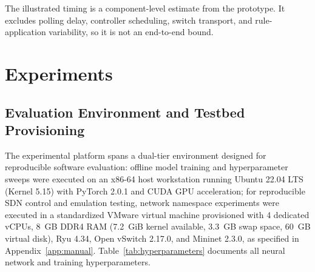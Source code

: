 \documentclass[12pt,a4paper,oneside]{report}
\begin{document}
The illustrated timing is a component-level estimate from the prototype. It excludes polling delay, controller scheduling, switch transport, and rule-application variability, so it is not an end-to-end bound.

\section{Experiments}
\label{sec:experiments}

\subsection{Evaluation Environment and Testbed Provisioning}
The experimental platform spans a dual-tier environment designed for reproducible software evaluation: offline model training and hyperparameter sweeps were executed on an x86-64 host workstation running Ubuntu 22.04 LTS (Kernel 5.15) with PyTorch 2.0.1 and CUDA GPU acceleration; for reproducible SDN control and emulation testing, network namespace experiments were executed in a standardized VMware virtual machine provisioned with 4 dedicated vCPUs, 8~GB DDR4 RAM (7.2~GiB kernel available, 3.3~GB swap space, 60~GB virtual disk), Ryu 4.34, Open vSwitch 2.17.0, and Mininet 2.3.0, as specified in Appendix~\ref{app:manual}. Table~\ref{tab:hyperparameters} documents all neural network and training hyperparameters.
\end{document}
